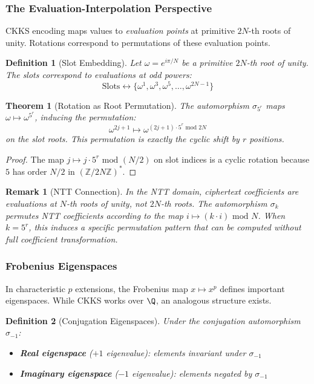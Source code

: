 \documentclass[11pt,a4paper]{article}
\newtheorem{definition}{Definition}
\newtheorem{theorem}{Theorem}
\newtheorem{remark}{Remark}
\newcommand{\Z}{\mathbb{Z}}
\newcommand{\bmod}{\text{ mod }}
\begin{document}
\subsubsection{The Evaluation-Interpolation Perspective}

CKKS encoding maps values to \emph{evaluation points} at primitive $2N$-th roots of unity. Rotations correspond to permutations of these evaluation points.

\begin{definition}[Slot Embedding]
Let $\omega = e^{i\pi/N}$ be a primitive $2N$-th root of unity. The slots correspond to evaluations at odd powers:
\[
\text{Slots} \leftrightarrow \{ \omega^1, \omega^3, \omega^5, \ldots, \omega^{2N-1} \}
\]
\end{definition}

\begin{theorem}[Rotation as Root Permutation]
The automorphism $\sigma_{5^r}$ maps $\omega \mapsto \omega^{5^r}$, inducing the permutation:
\[
\omega^{2j+1} \mapsto \omega^{(2j+1) \cdot 5^r \bmod 2N}
\]
on the slot roots. This permutation is exactly the cyclic shift by $r$ positions.
\end{theorem}

\begin{proof}
The map $j \mapsto j \cdot 5^r \bmod (N/2)$ on slot indices is a cyclic rotation because $5$ has order $N/2$ in $(\Z/2N\Z)^*$.
\end{proof}

\begin{remark}[NTT Connection]
In the NTT domain, ciphertext coefficients are evaluations at $N$-th roots of unity, \emph{not} $2N$-th roots. The automorphism $\sigma_k$ permutes NTT coefficients according to the map $i \mapsto (k \cdot i) \bmod N$. When $k = 5^r$, this induces a specific permutation pattern that can be computed without full coefficient transformation.
\end{remark}

\subsubsection{Frobenius Eigenspaces}

In characteristic $p$ extensions, the Frobenius map $x \mapsto x^p$ defines important eigenspaces. While CKKS works over $\Q$, an analogous structure exists.

\begin{definition}[Conjugation Eigenspaces]
Under the conjugation automorphism $\sigma_{-1}$:
\begin{itemize}
    \item \textbf{Real eigenspace} ($+1$ eigenvalue): elements invariant under $\sigma_{-1}$
    \item \textbf{Imaginary eigenspace} ($-1$ eigenvalue): elements negated by $\sigma_{-1}$
\end{itemize}
\end{definition}
\end{document}
